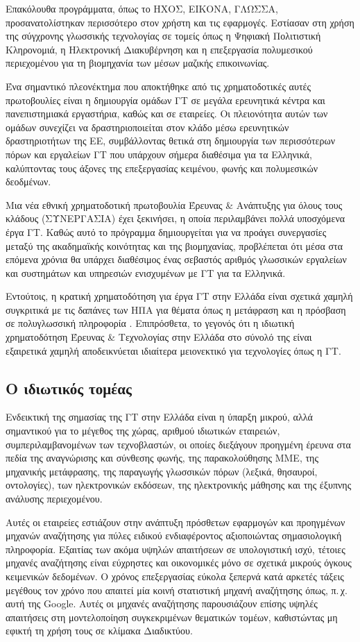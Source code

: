 \begin{multicols}{2}
Επακόλουθα προγράμματα, όπως το ΗΧΟΣ, ΕΙΚΟΝΑ, ΓΛΩΣΣΑ, προσανατολίστηκαν περισσότερο στον χρήστη και τις εφαρμογές. Εστίασαν στη χρήση της σύγχρονης γλωσσικής τεχνολογίας σε τομείς όπως η Ψηφιακή Πολιτιστική Κληρονομιά, η Ηλεκτρονική Διακυβέρνηση και η επεξεργασία πολυμεσικού περιεχομένου για τη βιομηχανία των μέσων μαζικής επικοινωνίας.

Ένα σημαντικό πλεονέκτημα που αποκτήθηκε από τις χρηματοδοτικές αυτές πρωτοβουλίες είναι η δημιουργία ομάδων ΓΤ σε μεγάλα ερευνητικά κέντρα και πανεπιστημιακά εργαστήρια, καθώς και σε εταιρείες. Οι πλειονότητα αυτών των ομάδων συνεχίζει να δραστηριοποιείται στον κλάδο μέσω ερευνητικών δραστηριοτήτων της ΕΕ, συμβάλλοντας θετικά στη δημιουργία των περισσότερων πόρων και εργαλείων ΓΤ που υπάρχουν σήμερα διαθέσιμα για τα Ελληνικά, καλύπτοντας τους άξονες της επεξεργασίας κειμένου, φωνής και πολυμεσικών δεοδμένων. 

Μια νέα εθνική χρηματοδοτική πρωτοβουλία Έρευνας \& Ανάπτυξης για όλους τους κλάδους (ΣΥΝΕΡΓΑΣΙΑ) έχει ξεκινήσει, η οποία περιλαμβάνει πολλά υποσχόμενα έργα ΓΤ. Καθώς αυτό το πρόγραμμα δημιουργείται για να προάγει συνεργασίες μεταξύ της ακαδημαϊκής κοινότητας και της βιομηχανίας, προβλέπεται ότι μέσα στα επόμενα χρόνια θα υπάρχει διαθέσιμος ένας σεβαστός αριθμός γλωσσικών εργαλείων και συστημάτων και υπηρεσιών ενισχυμένων με ΓΤ για τα Ελληνικά.

Εντούτοις, η κρατική χρηματοδότηση για έργα ΓΤ στην Ελλάδα είναι σχετικά χαμηλή συγκριτικά με τις δαπάνες των ΗΠΑ για θέματα όπως η μετάφραση και η πρόσβαση σε πολυγλωσσική πληροφορία \cite{laz2}. Επιπρόσθετα, το γεγονός ότι η ιδιωτική χρηματοδότηση Έρευνας \& Τεχνολογίας στην Ελλάδα στο σύνολό της είναι εξαιρετικά χαμηλή αποδεικνύεται ιδιαίτερα μειονεκτικό για τεχνολογίες όπως η ΓΤ.

\subsection{Ο ιδιωτικός τομέας}

Ενδεικτική της σημασίας της ΓΤ στην Ελλάδα είναι η ύπαρξη μικρού, αλλά σημαντικού για το μέγεθος της χώρας, αριθμού ιδιωτικών εταιρειών, συμπεριλαμβανομένων των τεχνοβλαστών, οι οποίες διεξάγουν προηγμένη έρευνα στα πεδία της αναγνώρισης και σύνθεσης φωνής, της παρακολούθησης ΜΜΕ, της μηχανικής μετάφρασης, της παραγωγής γλωσσικών πόρων (λεξικά, θησαυροί, οντολογίες), των ηλεκτρονικών εκδόσεων, της ηλεκτρονικής μάθησης και της έξυπνης ανάλυσης περιεχομένου.

Αυτές οι εταιρείες εστιάζουν στην ανάπτυξη πρόσθετων  εφαρμογών και προηγμένων μηχανών αναζήτησης για πύλες ειδικού ενδιαφέροντος αξιοποιώντας σημασιολογική πληροφορία. Εξαιτίας των ακόμα υψηλών απαιτήσεων σε υπολογιστική ισχύ, τέτοιες μηχανές αναζήτησης είναι εύχρηστες και οικονομικές  μόνο σε σχετικά μικρούς όγκους κειμενικών δεδομένων. Ο χρόνος επεξεργασίας εύκολα ξεπερνά κατά αρκετές τάξεις μεγέθους τον χρόνο που απαιτεί μία κοινή  στατιστική μηχανή αναζήτησης όπως, π.\,χ. αυτή της Google. Αυτές οι μηχανές αναζήτησης παρουσιάζουν επίσης υψηλές απαιτήσεις  στη μοντελοποίηση συγκεκριμένων θεματικών τομέων, καθιστώντας μη εφικτή τη χρήση τους σε  κλίμακα Διαδικτύου.


\end{multicols}

